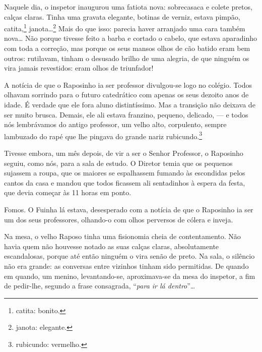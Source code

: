 Naquele dia, o inspetor inaugurou uma fatiota nova: sobrecasaca e colete
pretos, calças claras. Tinha uma gravata elegante, botinas de verniz,
estava pimpão, catita,\footnote{catita: bonito.}
janota\ldots{}\footnote{janota: elegante.} Mais do que isso: parecia
haver arranjado uma cara também nova\ldots{} Não porque tivesse feito a
barba e cortado o cabelo, que estava aparadinho com toda a correção, mas
porque os seus mansos olhos de cão batido eram bem outros: rutilavam,
tinham o desusado brilho de uma alegria, de que ninguém os vira jamais
revestidos: eram olhos de triunfador!

A notícia de que o Raposinho ia ser professor divulgou-se logo no
colégio. Todos olhavam sorrindo para o futuro catedrático com apenas os
seus dezoito anos de idade. É verdade que ele fora aluno distintíssimo.
Mas a transição não deixava de ser muito brusca. Demais, ele ali estava
franzino, pequeno, delicado, --- e todos nós lembrávamos do antigo
professor, um velho alto, corpulento, sempre lambuzado do rapé que lhe
pingava do grande nariz rubicundo.\footnote{rubicundo: vermelho.}

Tivesse embora, um mês depois, de vir a ser o Senhor Professor, o
Raposinho seguiu, como nós, para a sala de estudo. O Diretor temia que
os pequenos sujassem a roupa, que os maiores se espalhassem fumando às
escondidas pelos cantos da casa e mandou que todos ficassem ali
sentadinhos à espera da festa, que devia começar às 11 horas em ponto.

Fomos. O Fuinha lá estava, desesperado com a notícia de que o Raposinho
ia ser um dos seus professores, olhando-o com olhos perversos de cólera
e inveja.

Na mesa, o velho Raposo tinha uma fisionomia cheia de contentamento. Não
havia quem não houvesse notado as suas calças claras, absolutamente
escandalosas, porque até então ninguém o vira senão de preto. Na sala, o
silêncio não era grande: as conversas entre vizinhos tinham sido
permitidas. De quando em quando, um menino, levantando-se, aproximava-se
da mesa do inspetor, a fim de pedir-lhe, segundo a frase consagrada,
``\emph{para ir lá dentro}''\ldots{}


